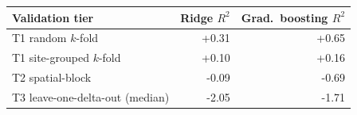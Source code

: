 \begin{tabular}{lrr}
\toprule
Validation tier & Ridge $R^2$ & Grad.\ boosting $R^2$ \\
\midrule
T1 random $k$-fold & +0.31 & +0.65 \\
T1 site-grouped $k$-fold & +0.10 & +0.16 \\
T2 spatial-block & -0.09 & -0.69 \\
T3 leave-one-delta-out (median) & -2.05 & -1.71 \\
\bottomrule
\end{tabular}
